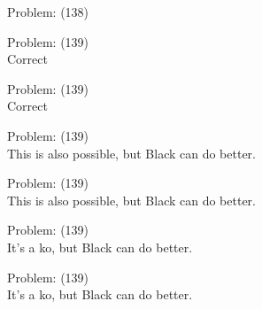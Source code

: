 \documentclass[11pt]{article}
\begin{document}
\begin{minipage}[t]{0.5\textwidth}
  {\centering
  
Problem: (138)\\
  }
\end{minipage}
\begin{minipage}[t]{0.5\textwidth}
  {\centering
  
Problem: (139)\\
Correct\\
  }
\end{minipage}
\begin{minipage}[t]{0.5\textwidth}
  {\centering
  
Problem: (139)\\
Correct\\
  }
\end{minipage}
\begin{minipage}[t]{0.5\textwidth}
  {\centering
  
Problem: (139)\\
This is also possible, but Black can do better.\\
  }
\end{minipage}
\begin{minipage}[t]{0.5\textwidth}
  {\centering
  
Problem: (139)\\
This is also possible, but Black can do better.\\
  }
\end{minipage}
\begin{minipage}[t]{0.5\textwidth}
  {\centering
  
Problem: (139)\\
It's a ko, but Black can do better.\\
  }
\end{minipage}
\begin{minipage}[t]{0.5\textwidth}
  {\centering
  
Problem: (139)\\
It's a ko, but Black can do better.\\
  }
\end{minipage}
\end{document}
